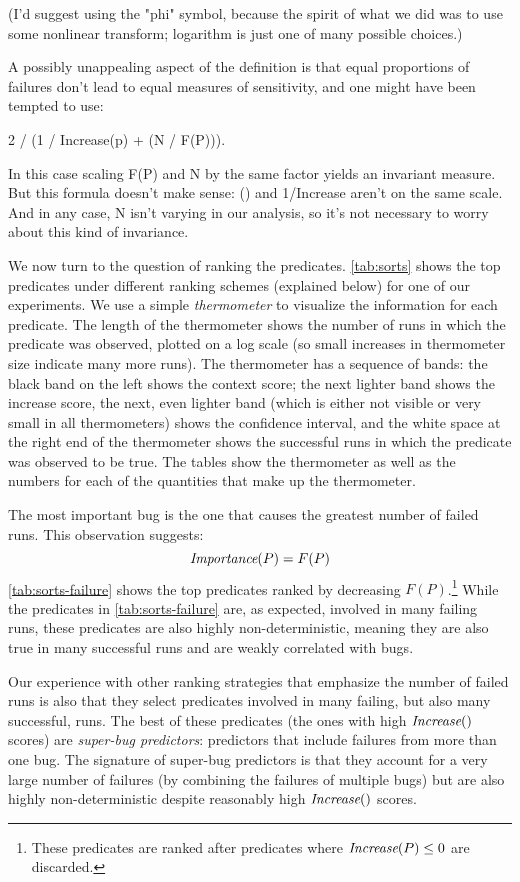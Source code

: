 {  (I'd suggest using the "phi" symbol, because the spirit of what we
  did was to use some nonlinear transform; logarithm is just one of
  many possible choices.)

  A possibly unappealing aspect of the definition is that equal
  proportions of failures don't lead to equal measures of sensitivity,
  and one might have been tempted to use:

   2 / (1 / Increase(p) + \phi(N / F(P))).

   In this case scaling F(P) and N by the same factor yields an
   invariant measure.  But this formula doesn't make sense: \phi() and
   1/Increase aren't on the same scale.  And in any case, N isn't
   varying in our analysis, so it's not necessary to worry about this
   kind of invariance.}

We now turn to the question of ranking the predicates.
\autoref{tab:sorts} shows the top
predicates under different ranking schemes (explained below) for one of our
experiments.  We use
a simple {\em thermometer} to visualize the information for each
predicate.  The length of the thermometer shows the number of runs in
which the predicate was observed, plotted on a log scale (so small increases
in thermometer size indicate many more runs).  The thermometer has
a sequence of bands:
the black band on the left shows the context score;
the next lighter band shows the increase score, the next, even  lighter band (which is either not
visible or very small in all thermometers) shows the confidence
interval, and the white space at the right end of the thermometer
shows the successful runs in which the predicate was
observed to be true.  The tables show the thermometer as well as the
numbers for each of the quantities that make up the thermometer. 

The most important bug is the one that causes the greatest number
of failed runs.  This observation suggests:
\[ \textit{Importance}(P) = F(P) \]
\autoref{tab:sorts-failure} shows the top predicates 
ranked by decreasing $F(P)$.\footnote{These predicates are ranked after predicates where $\textit{Increase}(P) \leq 0$ are discarded.}
While the predicates in \autoref{tab:sorts-failure} are, as expected, involved
in many failing runs, these predicates are also highly 
non-deterministic, meaning they are also true in many successful runs
and are weakly correlated with bugs.  

Our experience with other
ranking strategies that emphasize the number of failed runs is also that
they select predicates involved in many failing, but also many
successful, runs.  The best of these predicates (the ones with high
$\textit{Increase}()$ scores) are {\em super-bug predictors}:
predictors that include failures from more than one bug.  The
signature of super-bug predictors is that they account for a very
large number of failures (by combining the failures of multiple bugs)
but are also highly non-deterministic despite reasonably high $\textit{Increase}()$
scores.

